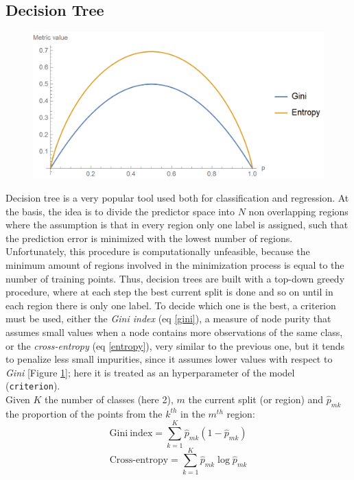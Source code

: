 \documentclass[letterpaper]{article}
\begin{document}
	\subsection{Decision Tree}
	\begin{figure}[h]
		\centering
		\includegraphics[width=.55\textwidth]{images/gini_vs_entropy.png}
		\label{fig:15}
	\end{figure}
	Decision tree is a very popular tool used both for classification and regression. At the basis, the idea is to divide the predictor space into $N$ non overlapping regions where the assumption is that in every region only one label is assigned, such that the prediction error is minimized with the lowest number of regions. Unfortunately, this procedure is computationally unfeasible, because the minimum amount of regions involved in the minimization process is equal to the number of training points. Thus, decision trees are built with a top-down greedy procedure, where at each step the best current split is done and so on until in each region there is only one label. To decide which one is the best, a criterion must be used, either the \emph{Gini index} (eq \ref{gini}), a measure of node purity that assumes small values when a node contains more observations of the same class, or the \emph{cross-entropy} (eq \ref{entropy}), very similar to the previous one, but it tends to penalize less small impurities, since it assumes lower values with respect to \emph{Gini} [Figure \ref{fig:15}]; here it is treated as an hyperparameter of the model (\texttt{criterion}). \\
	Given $K$ the number of classes (here 2), $m$ the current split (or region) and $\hat{p}_{mk}$ the proportion of the points from the $k^{th}$ in the $m^{th}$ region:
	\begin{equation} \label{gini}
		\mathrm{Gini\ index}=\sum_{k=1}^{K}\hat{p}_{mk}(1-\hat{p}_{mk})
	\end{equation}
	\begin{equation} \label{entropy}
		\mathrm{Cross\mbox{-}entropy}=\sum_{k=1}^{K}\hat{p}_{mk}\log\hat{p}_{mk}
	\end{equation}\\
\end{document}
